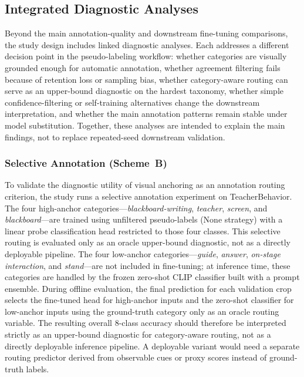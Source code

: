 \documentclass{ieeeaccess}
\begin{document}
\subsection{Integrated Diagnostic Analyses}
\label{sec:additional_experiments}

Beyond the main annotation-quality and downstream fine-tuning
comparisons, the study design includes linked diagnostic analyses.
Each addresses a different decision point in the pseudo-labeling
workflow: whether categories are visually grounded enough for automatic
annotation, whether agreement filtering fails because of retention loss
or sampling bias, whether category-aware routing can serve as an
upper-bound diagnostic on the hardest taxonomy, whether simple
confidence-filtering or self-training alternatives change the
downstream interpretation, and whether the main annotation patterns
remain stable under model substitution.
Together, these analyses are intended to explain the main findings,
not to replace repeated-seed downstream validation.

\subsubsection{Selective Annotation (Scheme~B)}

To validate the diagnostic utility of visual anchoring as an annotation
routing criterion, the study runs a selective annotation experiment on
TeacherBehavior.
The four high-anchor categories---\textit{blackboard-writing},
\textit{teacher}, \textit{screen}, and \textit{blackboard}---are
trained using unfiltered pseudo-labels (None strategy) with a linear
probe classification head restricted to those four classes.
This selective routing is evaluated only as an oracle upper-bound
diagnostic, not as a directly deployable pipeline.
The four low-anchor categories---\textit{guide}, \textit{answer},
\textit{on-stage interaction}, and \textit{stand}---are not included
in fine-tuning; at inference time, these categories are handled by the
frozen zero-shot CLIP classifier built with a prompt ensemble.
During offline evaluation, the final prediction for each validation
crop selects the fine-tuned head for high-anchor inputs and the
zero-shot classifier for low-anchor inputs using the ground-truth
category only as an oracle routing variable.
The resulting overall 8-class accuracy should therefore be interpreted
strictly as an upper-bound diagnostic for category-aware routing, not
as a directly deployable inference pipeline.
A deployable variant would need a separate routing predictor derived
from observable cues or proxy scores instead of ground-truth labels.
\end{document}
